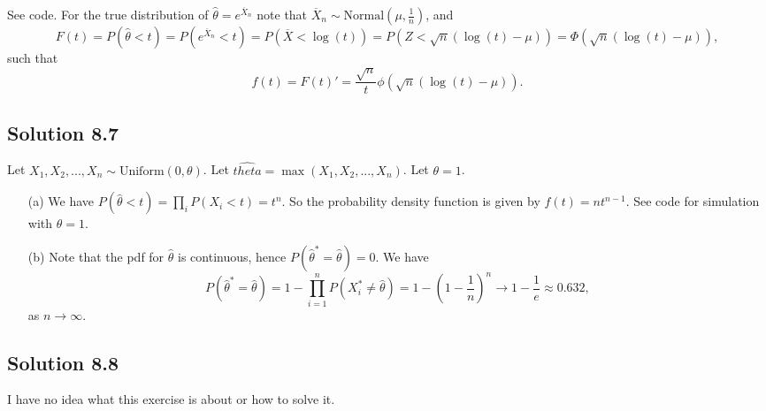 See code.
For the true distribution of $\hat{\theta} = e^{\overline{X}_n}$ note that $\overline{X}_n \sim \mathrm{Normal}(\mu, \frac{1}{n})$, and
\begin{equation*}
    F(t)
        = P(\hat{\theta} < t)
        = P\left(e^{\overline{X}_n} < t\right)
        = P(\overline{X} < \log(t))
        = P(Z < \sqrt{n}(\log(t) - \mu))
        = \Phi(\sqrt{n}(\log(t) - \mu)),
\end{equation*}
such that
\begin{equation*}
    f(t)
        = F(t)'
        = \frac{\sqrt{n}}{t} \phi(\sqrt{n}(\log(t) - \mu)).
\end{equation*}


\subsection*{Solution 8.7}

Let $X_1, X_2, ..., X_n \sim \mathrm{Uniform}(0, \theta)$.
Let $\hat{theta} = \max(X_1, X_2, ..., X_n)$.
Let $\theta = 1$.
\begin{itemize}
    \item[(a)] We have $P(\hat{\theta} < t) = \prod_i P(X_i < t) = t^n$.
        So the probability density function is given by $f(t) = nt^{n-1}$.
        See code for simulation with $\theta = 1$.
    \item[(b)] Note that the pdf for $\hat{\theta}$ is continuous, hence $P(\hat{\theta}^* = \hat{\theta}) = 0$.
        We have
        \begin{equation*}
            P(\hat{\theta}^* = \hat{\theta})
                = 1 - \prod_{i = 1}^n P(X_i^* \neq \hat{\theta})
                = 1 - \left(1 - \frac{1}{n}\right)^n
                \to 1 - \frac{1}{e} \approx 0.632,
        \end{equation*}
        as $n \to \infty$.
\end{itemize}


\subsection*{Solution 8.8}

I have no idea what this exercise is about or how to solve it.

